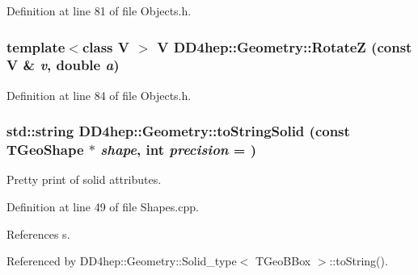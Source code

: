 Definition at line 81 of file Objects.h.\hypertarget{namespace_d_d4hep_1_1_geometry_a4d413c51d1ece05ff9e6fc14246b8d95}{
\subsubsection[{RotateZ}]{\setlength{\rightskip}{0pt plus 5cm}template$<$class V $>$ V DD4hep::Geometry::RotateZ (const V \& {\em v}, \/  double {\em a})}}
\label{namespace_d_d4hep_1_1_geometry_a4d413c51d1ece05ff9e6fc14246b8d95}


Definition at line 84 of file Objects.h.\hypertarget{namespace_d_d4hep_1_1_geometry_abd683b63937908cc4e95e3db3d4879a0}{
\subsubsection[{toStringSolid}]{\setlength{\rightskip}{0pt plus 5cm}std::string DD4hep::Geometry::toStringSolid (const TGeoShape $\ast$ {\em shape}, \/  int {\em precision} = {})}}
\label{namespace_d_d4hep_1_1_geometry_abd683b63937908cc4e95e3db3d4879a0}


Pretty print of solid attributes. 

Definition at line 49 of file Shapes.cpp.

References s.

Referenced by DD4hep::Geometry::Solid\_\-type$<$ TGeoBBox $>$::toString().